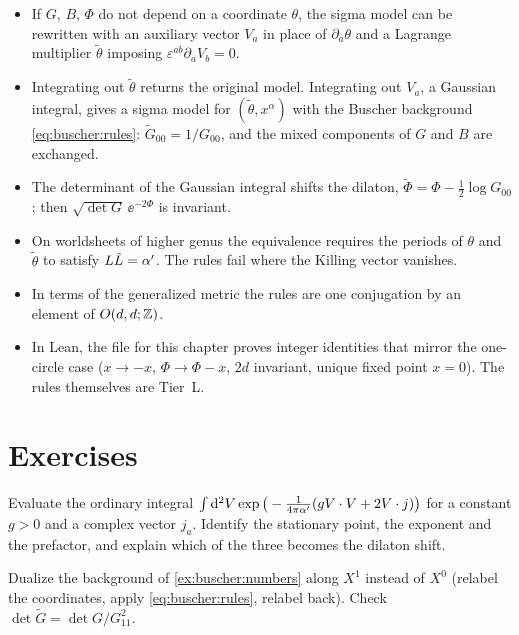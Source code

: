 \begin{summarybox}
\begin{itemize}[leftmargin=*,itemsep=1pt]
\item If $G$, $B$, $\Phi$ do not depend on a coordinate $\theta$, the sigma model can be
 rewritten with an auxiliary vector $V_a$ in place of $\partial_a\theta$ and a Lagrange
 multiplier $\tilde\theta$ imposing $\varepsilon^{ab}\partial_aV_b=0$.
\item Integrating out $\tilde\theta$ returns the original model. Integrating out $V_a$, a
 Gaussian integral, gives a sigma model for $(\tilde\theta,x^\alpha)$ with the Buscher
 background \eqref{eq:buscher:rules}: $\tilde G_{00}=1/G_{00}$, and the mixed components of
 $G$ and $B$ are exchanged.
\item The determinant of the Gaussian integral shifts the dilaton,
 $\tilde\Phi=\Phi-\frac12\log G_{00}$; then $\sqrt{\det G}\,\ee^{-2\Phi}$ is invariant.
\item On worldsheets of higher genus the equivalence requires the periods of $\theta$ and
 $\tilde\theta$ to satisfy $L\tilde L=\alpha'$. The rules fail where the Killing vector
 vanishes.
\item In terms of the generalized metric the rules are one conjugation by an element of
 $O(d,d;\mathbb{Z})$.
\item In Lean, the file for this chapter proves integer identities that mirror the one-circle
 case ($x\to-x$, $\Phi\to\Phi-x$, $2d$ invariant, unique fixed point $x=0$). The rules
 themselves are Tier~L.
\end{itemize}
\end{summarybox}

\section*{Exercises}

\begin{exercise}[$\star$]\label{exr:buscher:gauss}
Evaluate the ordinary integral $\int\mathrm{d}^2V\exp\big(-\frac{1}{4\pi\alpha'}(gV\cdot V+2V\cdot j)\big)$
for a constant $g>0$ and a complex vector $j_a$. Identify the stationary point, the exponent
and the prefactor, and explain which of the three becomes the dilaton shift.
\end{exercise}

\begin{exercise}[$\star$]\label{exr:buscher:numbers}
Dualize the background of \cref{ex:buscher:numbers} along $X^1$ instead of $X^0$ (relabel the
coordinates, apply \eqref{eq:buscher:rules}, relabel back). Check
$\det\tilde G=\det G/G_{11}^2$.
\end{exercise}

